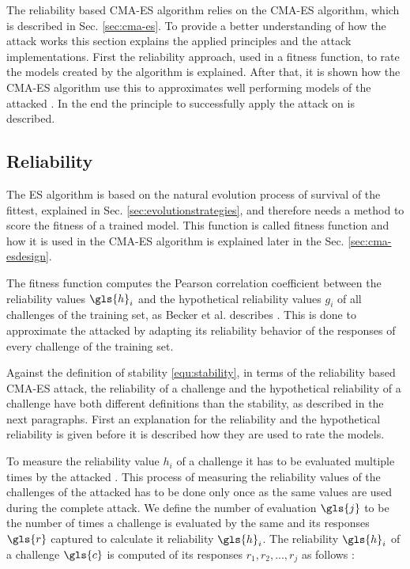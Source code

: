 The reliability based \ac{CMA-ES} algorithm relies on the \ac{CMA-ES} algorithm, which is described in Sec. \ref{sec:cma-es}.
To provide a better understanding of how the attack works this section explains the applied principles and the attack implementations. %
First the reliability approach, used in a fitness function, to rate the models created by the algorithm is explained.
After that, it is shown how the \ac{CMA-ES} algorithm use this to approximates well performing models of the attacked \apuf.
In the end the principle to successfully apply the attack on \xpufs is described.


\subsection{Reliability}
\label{sec:reliability}

The \ac{ES} algorithm is based on the natural evolution process of survival of the fittest, explained in Sec. \ref{sec:evolutionstrategies}, and therefore needs a method to score the fitness of a trained model.
This function is called fitness function and how it is used in the \ac{CMA-ES} algorithm is explained later in the Sec. \ref{sec:cma-esdesign}.

The fitness function computes the Pearson correlation coefficient between the reliability values $\gls{h}_i$ and the hypothetical reliability values $g_i$ of all challenges of the training set, as Becker et al. describes \cite{Becker2015ThePUFs}.
This is done to approximate the attacked \puf by adapting its reliability behavior of the responses of every challenge of the training set. %

Against the definition of stability \ref{equ:stability}, in terms of the reliability based \ac{CMA-ES} attack, the reliability of a challenge and the hypothetical reliability of a challenge have both different definitions than the stability, as described in the next paragraphs. 
First an explanation for the reliability and the hypothetical reliability is given before it is described how they are used to rate the models.

To measure the reliability value $h_i$ of a challenge it has to be evaluated multiple times by the attacked \puf.
This process of measuring the reliability values of the challenges of the attacked \puf has to be done only once as the same values are used during the complete attack. %
We define the number of evaluation $\gls{j}$ to be the number of times a challenge is evaluated by the same \puf and its responses $\gls{r}$ captured to calculate it reliability $\gls{h}_i$.
The reliability $\gls{h}_i$ of a challenge $\gls{c}$ is computed of its responses $r_1, r_2, ..., r_j$ as follows \cite{Becker2015ThePUFs}:

